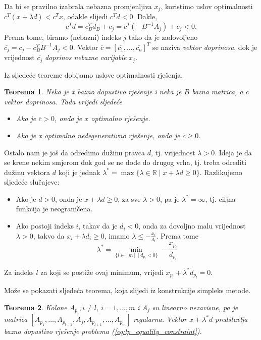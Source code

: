\documentclass[a4paper, utf8, 11pt, colorlinks]{book}
\newtheorem{thm}{Teorema}[chapter]
\theoremstyle{definition}
\begin{document}
Da bi se pravilno izabrala nebazna promjenljiva $x_j$, koristimo  uslov optimalnosti $c^T ( x + \lambda d ) < c^T x $, odakle slijedi $c^T d < 0$.  Dakle, $$c^T d = c_B^T d_B + c_j = c^T ( - B^{-1} A_j ) + c_j < 0.$$
 Prema tome, biramo (nebazni) indeks $j$ tako da je zadovoljeno $ \overline{c_j} = c_j - c_B^T B^{-1}A_j < 0$. Vektor $\overline{c}=[\overline{c_1}, \ldots, \overline{c_n}]^T$ se naziva \emph{vektor doprinosa}, dok je vrijednost $\overline{c_j}$ \emph{doprinos nebazne varijable} $x_j$. 
 
Iz sljedeće teoreme dobijamo uslove optimalnosti rješenja.

\begin{thm}
  Neka je x bazno dopustivo rješenje i neka je $B$ bazna matrica, a $\overline{c}$ vektor doprinosa. Tada vrijedi sljedeće
  \begin{itemize}
      \item Ako je $\overline{c} >0$, onda je $x$ optimalno rješenje.
      \item Ako je x optimalno nedegenerativno rješenje, onda je $\overline{c} \geq 0$.
  \end{itemize}
\end{thm}

Ostalo nam je još da odredimo dužinu   pravca $d$, tj. vrijednost $\lambda>0$. Ideja je da se krene nekim smjerom dok god se ne dođe do drugog vrha, tj. treba odrediti dužinu vektora $d$ koji je jednak $\lambda^* = \max \{ \lambda \in \mathbb{R} \mid x + \lambda d \geq 0 \}$. Razlikujemo sljedeće slučajeve:
\begin{itemize}
    \item Ako je $d >0$, onda je $  x + \lambda d \geq 0$, za sve $\lambda > 0$, pa je $\lambda^* = \infty$, tj. ciljna funkcija je neograničena.
    \item Ako postoji indeks $i$, takav da je $d_i < 0$, onda za dovoljno malu vrijednost $\lambda>0$, takvo da $x_i + \lambda d_i \geq 0$, imamo $\lambda \leq -\frac{x_i}{d_i}$. Prema tome 
    $$ \lambda^* = \min_{ \{i\in [m] \mid d_{p_i} < 0  \}} - \frac{x_{p_i}}{d_{p_i}} $$
\end{itemize}
Za indeks $l$ za koji se postiže ovaj minimum, vrijedi $x_{p_l} + \lambda^* d_{p_l}=0$.

Može se pokazati sljedeća teorema, koja slijedi iz konstrukcije simpleks metode.

\begin{thm}
    Kolone $A_{p_i}, i\not = l$, $i=1,\ldots,m$ i $A_{j}$ su linearno nezavisne, pa je matrica 
    $[A_{p_1},\ldots, A_{p_{l-1}}, A_j, A_{p_{l+1}}, \ldots, A_{p_m}]$
    regularna. Vektor $x + \lambda^* d$ predstavlja bazno dopustivo rješenje problema (\ref{eq:lp_equality_constraint}). 
\end{thm}
\end{document}
